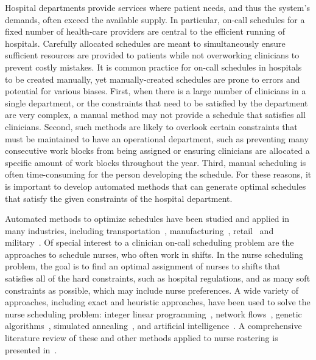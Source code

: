 Hospital departments provide services where patient needs, and thus the system's
demands, often exceed the available supply. In particular, on-call schedules for
a fixed number of health-care providers are central to the efficient running of
hospitals. Carefully allocated schedules are meant to simultaneously ensure
sufficient resources are provided to patients while not overworking clinicians
to prevent costly mistakes. It is common practice for on-call schedules in
hospitals to be created manually, yet manually-created schedules are prone to
errors and potential for various biases. First, when there is a large number of
clinicians in a single department, or the constraints that need to be satisfied
by the department are very complex, a manual method may not provide a schedule
that satisfies all clinicians. Second, such methods are likely to overlook
certain constraints that must be maintained to have an operational department,
such as preventing many consecutive work blocks from being assigned or ensuring
clinicians are allocated a specific amount of work blocks throughout the year.
Third, manual scheduling is often time-consuming for the person developing the
schedule. For these reasons, it is important to develop automated methods that
can generate optimal schedules that satisfy the given constraints of the
hospital department.

Automated methods to optimize schedules have been studied and applied in many
industries, including transportation~\cite{aickelin_improved_2006,
	goel_truck_2012, gunther_combined_2010}, manufacturing~\cite{al-yakoob_mixed-integer_2007, al-yakoob_column_2008,
	alfares_simulation_2007}, retail~\cite{chapados_retail_2011,
	nissen_automatic_2010} and military~\cite{horn_scheduling_2007,
	laguna_modeling_2005}. Of special interest to a clinician on-call scheduling
problem are the approaches to schedule nurses, who often work in shifts. In the
nurse scheduling problem, the goal is to find an optimal assignment of nurses to
shifts that satisfies all of the hard constraints, such as hospital regulations,
and as many soft constraints as possible, which may include nurse preferences. A
wide variety of approaches, including exact and heuristic approaches, have been
used to solve the nurse scheduling problem: integer linear programming~\cite{azaiez_0-1_2005, trilling_nurse_2006, widyastiti_nurses_2016}, network
flows~\cite{el_adoly_new_2018}, genetic algorithms~\cite{aickelin_exploiting_2000, jan_evolutionary_2000, kawanaka_genetic_2001},
simulated annealing~\cite{jaszkiewicz_metaheuristic_1997}, and artificial
intelligence~\cite{abdennadher_nurse_nodate, li_hybrid_2003}. A comprehensive
literature review of these and other methods applied to nurse rostering is
presented in~\cite{burke_state_2004}.

